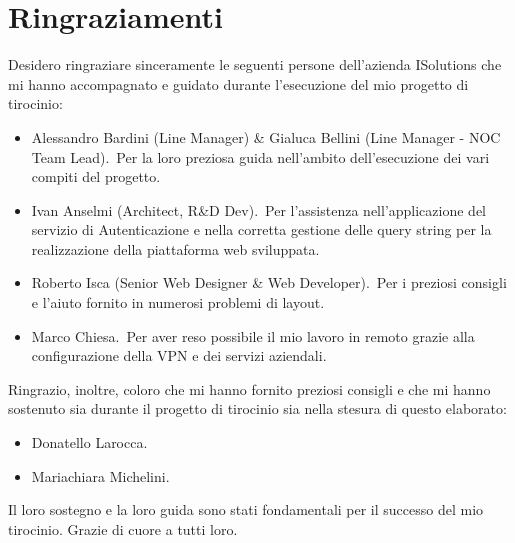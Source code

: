 \chapter*{Ringraziamenti}
Desidero ringraziare sinceramente le seguenti persone dell'azienda ISolutions che mi hanno 
accompagnato e guidato durante l'esecuzione del mio progetto di tirocinio:
\begin{itemize}
    \item Alessandro Bardini (Line Manager) \& Gialuca Bellini (Line Manager \-- NOC Team Lead).\ Per la loro preziosa guida nell'ambito dell'esecuzione dei vari compiti del progetto.
    \item Ivan Anselmi (Architect, R\&D Dev).\ Per l'assistenza nell'applicazione del servizio di Autenticazione e nella corretta gestione delle query string per la realizzazione della piattaforma web sviluppata.
    \item Roberto Isca (Senior Web Designer \& Web Developer).\ Per i preziosi consigli e l'aiuto fornito in numerosi problemi di layout.
    \item Marco Chiesa.\ Per aver reso possibile il mio lavoro in remoto grazie alla configurazione della VPN e dei servizi aziendali.
\end{itemize}
%
Ringrazio, inoltre, coloro che mi hanno fornito preziosi consigli e che mi hanno sostenuto sia durante il progetto di tirocinio sia nella stesura di questo elaborato:
\begin{itemize}
    \item Donatello Larocca.
    \item Mariachiara Michelini.
\end{itemize}
%
Il loro sostegno e la loro guida sono stati fondamentali per il successo del mio tirocinio. Grazie di cuore a tutti loro.